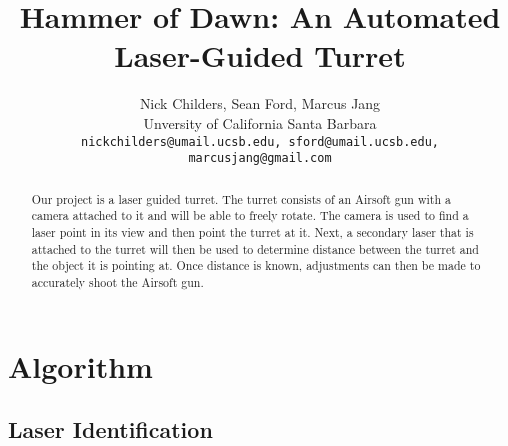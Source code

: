 \documentclass[10pt,twocolumn,letterpaper]{article}
\begin{document}
\title{Hammer of Dawn: An Automated Laser-Guided Turret}

\author{Nick Childers, Sean Ford, Marcus Jang\\
Unversity of California Santa Barbara\\
{\tt\small nickchilders@umail.ucsb.edu, sford@umail.ucsb.edu, marcusjang@gmail.com}
}

\maketitle
\thispagestyle{empty}

\begin{abstract}
Our project is a laser guided turret. The turret consists of an Airsoft gun with a camera attached to it and will be able to freely rotate. The camera is used to find a laser point in its view and then point the turret at it. Next, a secondary laser that is attached to the turret will then be used to determine distance between the turret and the object it is pointing at. Once distance is known, adjustments can then be made to accurately shoot the Airsoft gun.
\end{abstract}




\section{Algorithm}


\subsection{Laser Identification}
\end{document}
